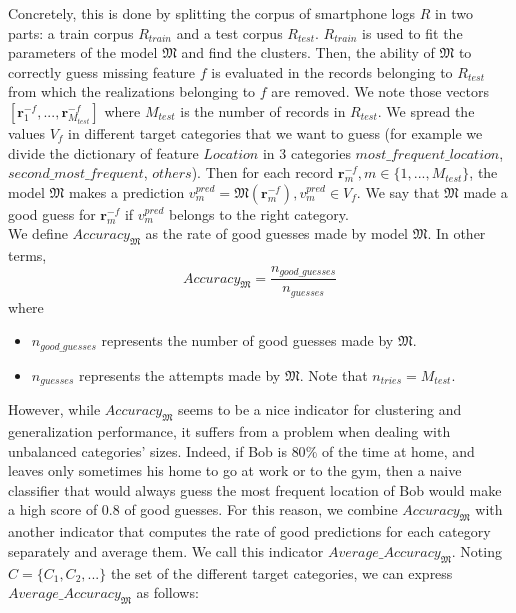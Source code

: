 Concretely, this is done by splitting the corpus of smartphone logs $R$ in two parts: a train corpus $R_{train}$ and a test corpus $R_{test}$. $R_{train}$ is used to fit the parameters of the model $\mathfrak{M}$ and find the clusters. Then, the ability of $\mathfrak{M}$ to correctly guess missing feature $f$ is evaluated in the records belonging to $R_{test}$  from which the realizations belonging to $f$ are removed. We note those vectors $[ \mathbf{r}_{1}^{-f},...,\mathbf{r}_{M_{test}}^{-f}]$ where $M_{test}$ is the number of records in $R_{test}$.
We spread the values $V_{f}$ in different target categories that we want to guess (for example we divide the dictionary of feature $Location$ in $3$ categories $most\_frequent\_location$, $second\_most\_frequent$, $others$). Then for each record $\mathbf{r}_{m}^{-f}, m \in \{1,...,M_{test}\}$, the model $\mathfrak{M}$ makes a prediction $v_{m}^{pred}=\mathfrak{M}(\mathbf{r}_{m}^{-f}), v_{m}^{pred} \in V_{f}$. We say that $\mathfrak{M}$ made a good guess for $\mathbf{r}_{m}^{-f}$ if $v_{m}^{pred}$ belongs to the right category. 
\\We define $Accuracy_{\mathfrak{M}}$ as the rate of good guesses made by model $\mathfrak{M}$. In other terms,
\begin{equation}
Accuracy_{\mathfrak{M}}=\frac{n_{good\_guesses}}{n_{guesses}}
\end{equation}
where 
\begin{itemize} 
	\item $n_{good\_guesses}$  represents the number of good guesses made by $\mathfrak{M}$.
	\item $n_{guesses}$ represents the attempts made by $\mathfrak{M}$. Note that $n_{tries}=M_{test}$.
\end{itemize}
However, while $Accuracy_{\mathfrak{M}}$ seems to be a nice indicator for clustering and generalization performance, it suffers from a problem when dealing with unbalanced categories' sizes. Indeed, if Bob is $80\%$ of the time at home, and leaves only sometimes his home to go at work or to the gym, then a naive classifier that would always guess the most frequent location of Bob would make a high score of $0.8$ of good guesses. For this reason, we combine $Accuracy_{\mathfrak{M}}$ with another indicator that computes the rate of good predictions for each category separately and average them. We call this indicator $Average\_Accuracy_{\mathfrak{M}}$. Noting $C=\{C_{1},C_{2},...\}$ the set of the different target categories, we can express $Average\_Accuracy_{\mathfrak{M}}$ as follows:
